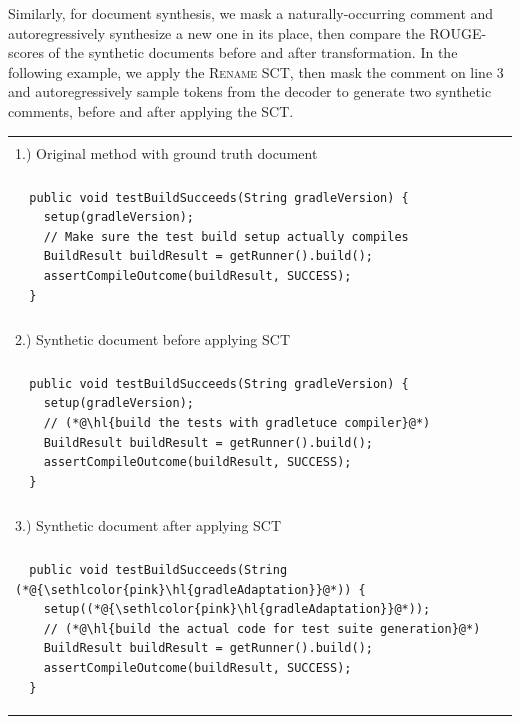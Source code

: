 \documentclass[usenames,dvipsnames]{article} %
\DeclareRobustCommand{\hlred}[1]{{\sethlcolor{pink}\hl{#1}}}
\begin{document}

  Similarly, for document synthesis, we mask a naturally-occurring comment and autoregressively synthesize a new one in its place, then compare the ROUGE-scores of the synthetic documents before and after transformation. In the following example, we apply the \textsc{Rename} SCT, then mask the comment on line 3 and autoregressively sample tokens from the decoder to generate two synthetic comments, before and after applying the SCT.

  \begin{center}
    \begin{tabular}{|p{7.5cm}|}
      \hline\\[-1em]1.) Original method with ground truth document \\[-1em]\\\hline
      \begin{lstlisting}
  public void testBuildSucceeds(String gradleVersion) {
    setup(gradleVersion);
    // Make sure the test build setup actually compiles
    BuildResult buildResult = getRunner().build();
    assertCompileOutcome(buildResult, SUCCESS);
  }
      \end{lstlisting}
      \\\hline\\[-1em]2.) Synthetic document before applying SCT \\[-1em]\\\hline
      \begin{lstlisting}
  public void testBuildSucceeds(String gradleVersion) {
    setup(gradleVersion);
    // (*@\hl{build the tests with gradletuce compiler}@*)
    BuildResult buildResult = getRunner().build();
    assertCompileOutcome(buildResult, SUCCESS);
  }
      \end{lstlisting}
      \\\hline\\[-1em]3.) Synthetic document after applying SCT \\[-1em]\\\hline
      \begin{lstlisting}
  public void testBuildSucceeds(String (*@\hlred{gradleAdaptation}@*)) {
    setup((*@\hlred{gradleAdaptation}@*));
    // (*@\hl{build the actual code for test suite generation}@*)
    BuildResult buildResult = getRunner().build();
    assertCompileOutcome(buildResult, SUCCESS);
  }
      \end{lstlisting}\\\hline
    \end{tabular}
  \end{center}
\end{document}
